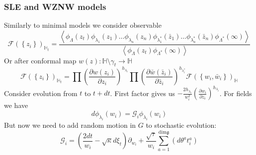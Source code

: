 \documentclass[pdftex]{beamer}
\newcommand{\gf}{\mathfrak{g}}
\theoremstyle{definition} \newtheorem{Def}{Definition}
\begin{document}
\begin{frame}
  \frametitle{SLE and WZNW models}
  Similarly to minimal models we consider observable
  \begin{equation*}
    \mathcal{F}(\left\{z_{i}\right\})_{\mathbb{H}_{t}}=
    \frac{\left<\phi_{\Lambda}(z_{t}) \phi_{\lambda_1}(z_{1}) \dots \phi_{\lambda_n}(z_{n}) \phi_{\lambda^{*}_1}(\bar z_{1}) \dots \phi_{\lambda^{*}_n}(\bar z_{n})
        \phi_{\Lambda^{*}}(\infty)\right>}{\left<\phi_{\Lambda}(z_{t})\phi_{\Lambda^{*}}(\infty)\right>}
  \end{equation*}
  Or after conformal map $w(z):\mathbb{H}\setminus\gamma_{t}\to \mathbb{H}$
  \begin{equation*}
    \mathcal{F}(\left\{z_{i}\right\})_{\mathbb{H}_{t}}=\prod \left(\frac{\partial w(z_{i})}{\partial z_{i}}\right)^{h_{\lambda_i}} 
    \prod \left(\frac{\partial \bar w(\bar z_{i})}{\partial \bar z_{i}}\right)^{h_{\lambda^{*}_i}}
        \mathcal{F}(\left\{w_{i}, \bar w_{i}\right\})_{\mathbb{H}}
  \end{equation*}
  Consider evolution from $t$ to $t+dt$. First factor gives us $-\frac{2h_{\lambda_{i}}}{w_{i}^{2}}\left(\frac{\partial w_{i}}{\partial z_{i}}\right)^{h_{\lambda_{i}}}$. For fields we have
  \begin{equation*}
    d\phi_{\lambda_{i}}(w_{i}) = \mathcal{G}_{i}\phi_{\lambda_{i}}(w_{i})
  \end{equation*}
  But now we need to add random motion in $G$ to stochastic evolution:
  \begin{equation*}
    \mathcal{G}_{i}=\left(\frac{2dt}{w_{i}}-\sqrt{\kappa} d\xi_{t}\right) \partial_{w_{i}}+\frac{\sqrt{\tau}}{w_{i}}\sum_{a=1}^{\mathrm{dim} \gf}\left(d \theta ^{a} t^{a}_{i}\right)
  \end{equation*}
\end{frame}
\end{document}
